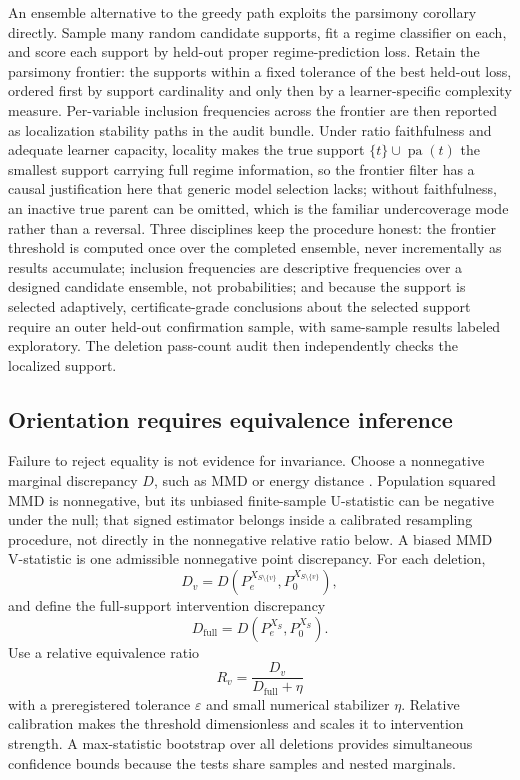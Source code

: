 \documentclass[11pt]{article}
\newcommand{\pa}{\operatorname{pa}}
\newcommand{\eps}{\varepsilon}
\begin{document}
An ensemble alternative to the greedy path exploits the parsimony corollary directly.  Sample many random candidate supports, fit a regime classifier on each, and score each support by held-out proper regime-prediction loss.  Retain the parsimony frontier: the supports within a fixed tolerance of the best held-out loss, ordered first by support cardinality and only then by a learner-specific complexity measure.  Per-variable inclusion frequencies across the frontier are then reported as localization stability paths in the audit bundle.  Under ratio faithfulness and adequate learner capacity, locality makes the true support \(\{t\}\cup\pa(t)\) the smallest support carrying full regime information, so the frontier filter has a causal justification here that generic model selection lacks; without faithfulness, an inactive true parent can be omitted, which is the familiar undercoverage mode rather than a reversal.  Three disciplines keep the procedure honest: the frontier threshold is computed once over the completed ensemble, never incrementally as results accumulate; inclusion frequencies are descriptive frequencies over a designed candidate ensemble, not probabilities; and because the support is selected adaptively, certificate-grade conclusions about the selected support require an outer held-out confirmation sample, with same-sample results labeled exploratory.  The deletion pass-count audit then independently checks the localized support.

\subsection{Orientation requires equivalence inference}

Failure to reject equality is not evidence for invariance.  Choose a nonnegative marginal discrepancy \(D\), such as MMD \citep{gretton2012mmd} or energy distance \citep{szekely2013energy}.  Population squared MMD is nonnegative, but its unbiased finite-sample U-statistic can be negative under the null; that signed estimator belongs inside a calibrated resampling procedure, not directly in the nonnegative relative ratio below.  A biased MMD V-statistic is one admissible nonnegative point discrepancy.  For each deletion,
\begin{equation}
D_v=D(P_e^{X_{S\setminus\{v\}}},P_0^{X_{S\setminus\{v\}}}),
\end{equation}
and define the full-support intervention discrepancy
\begin{equation}
D_{\mathrm{full}}=D(P_e^{X_S},P_0^{X_S}).
\end{equation}
Use a relative equivalence ratio
\begin{equation}
R_v=\frac{D_v}{D_{\mathrm{full}}+\eta}
\end{equation}
with a preregistered tolerance \(\eps\) and small numerical stabilizer \(\eta\).  Relative calibration makes the threshold dimensionless and scales it to intervention strength.  A max-statistic bootstrap over all deletions provides simultaneous confidence bounds because the tests share samples and nested marginals.
\end{document}
